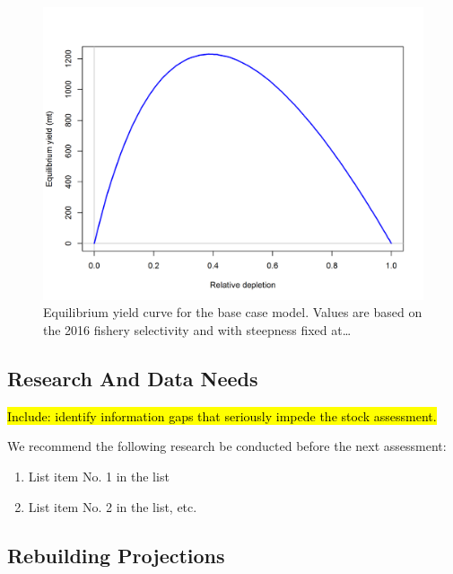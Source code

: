 \documentclass[12pt,]{article}
\begin{document}
\begin{figure}
\centering
\includegraphics{r4ss/plots_mod1/yield1_yield_curve.png}
\caption{Equilibrium yield curve for the base case model. Values are
based on the 2016 fishery selectivity and with steepness fixed
at\ldots{} \label{fig:Yield_all}}
\end{figure}

\FloatBarrier

\newpage

\subsection*{Research And Data Needs}\label{research-and-data-needs}

\hl{Include: identify information gaps that seriously impede the stock assessment.}

We recommend the following research be conducted before the next
assessment:

\begin{enumerate}

\item List item No. 1 in the list

\item List item No. 2 in the list, etc.

\end{enumerate}

\subsection*{Rebuilding Projections}\label{rebuilding-projections}
\end{document}
